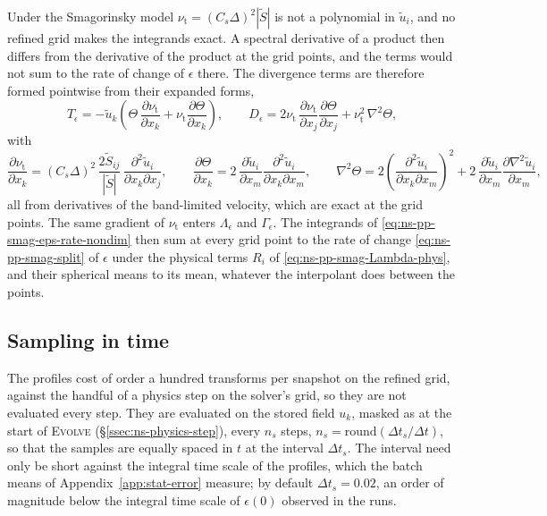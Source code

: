 \documentclass{article}
\begin{document}
Under the Smagorinsky model $\nu_{\mathrm{t}} = (C_s \Delta)^2 |\tilde S|$ is not a
polynomial in $\tilde u_i$, and no refined grid makes the integrands exact.
A spectral derivative of a product then differs from the derivative of the
product at the grid points, and the terms would not sum to the rate of
change of $\epsilon$ there. The divergence terms are therefore formed
pointwise from their expanded forms,
\begin{equation}\label{eq:radial-smag-pointwise}
  T_\epsilon = -\tilde u_k \left( \Theta\, \frac{\partial \nu_{\mathrm{t}}}{\partial x_k}
  + \nu_{\mathrm{t}} \frac{\partial \Theta}{\partial x_k} \right) ,
  \qquad
  D_\epsilon = 2 \nu_{\mathrm{t}}\, \frac{\partial \nu_{\mathrm{t}}}{\partial x_j} \frac{\partial \Theta}{\partial x_j}
  + \nu_{\mathrm{t}}^2\, \nabla^2 \Theta ,
\end{equation}
with
\begin{equation*}
  \frac{\partial \nu_{\mathrm{t}}}{\partial x_k}
  = (C_s \Delta)^2\, \frac{2 \tilde S_{ij}}{|\tilde S|}\, \frac{\partial^2 \tilde u_i}{\partial x_k \partial x_j} ,
  \qquad
  \frac{\partial \Theta}{\partial x_k}
  = 2\, \frac{\partial \tilde u_i}{\partial x_m} \frac{\partial^2 \tilde u_i}{\partial x_k \partial x_m} ,
  \qquad
  \nabla^2 \Theta
  = 2 \left( \frac{\partial^2 \tilde u_i}{\partial x_k \partial x_m} \right)^2
  + 2\, \frac{\partial \tilde u_i}{\partial x_m} \frac{\partial \nabla^2 \tilde u_i}{\partial x_m} ,
\end{equation*}
all from derivatives of the band-limited velocity, which are exact at the
grid points. The same gradient of $\nu_{\mathrm{t}}$ enters $\Lambda_\epsilon$ and
$\Gamma_\epsilon$. The integrands of
\eqref{eq:ns-pp-smag-eps-rate-nondim} then sum at every grid point to the
rate of change \eqref{eq:ns-pp-smag-split} of $\epsilon$ under the physical
terms $R_i$ of \eqref{eq:ns-pp-smag-Lambda-phys}, and their spherical means
to its mean, whatever the interpolant does between the points.

\subsection{Sampling in time}\label{ssec:radial-sampling}
The profiles cost of order a hundred transforms per snapshot on the refined
grid, against the handful of a physics step on the solver's grid, so they are
not evaluated every step. They are evaluated on
the stored field $u_k$, masked as at the start of \textsc{Evolve}
(\S\ref{ssec:ns-physics-step}), every $n_s$ steps, $n_s = \mathrm{round}(\Delta t_s /
\Delta t)$, so that the samples are equally spaced in $t$ at the interval
$\Delta t_s$. The interval need only be short against the integral time scale
of the profiles, which the batch means of Appendix~\ref{app:stat-error}
measure; by default $\Delta t_s = 0.02$, an order of magnitude below the
integral time scale of $\epsilon(0)$ observed in the runs.
\end{document}
